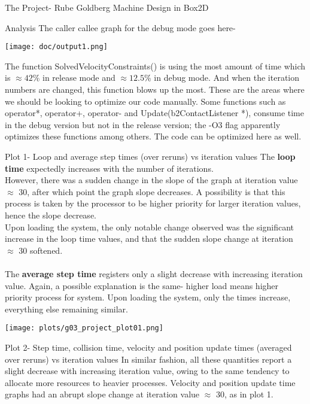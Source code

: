 \documentclass[a4paper,11pt]{article}
\begin{document}
\begin{section}{The Project- Rube Goldberg Machine Design in Box2D}
\begin{subsection}{Analysis}
The caller callee graph for the debug mode goes here-
\begin{center}\texttt{[image: doc/output1.png]}\end{center}
The function SolvedVelocityConstraints() is using the most amount of time which is \(\approx 42\%\) in release mode and \(\approx 12.5\%\) in debug mode. And when the iteration numbers are changed, this function blows up the most. These are the areas where we should be looking to optimize our code manually.
Some functions such as operator*, operator+, operator- and Update(b2ContactListener *), consume time in the debug version but not in the release version; the -O3 flag apparently optimizes these functions among others. The code can be optimized here as well.\\
\end{subsection}
\begin{subsection}{Plot 1- Loop and average step times (over reruns) vs iteration values}
The \textbf{loop time} expectedly increases with the number of iterations.\\ However, there was a sudden change in the slope of the graph at iteration value \(\approx\) 30, after which point the graph slope decreases. A possibility is that this process is taken by the processor to be higher priority for larger iteration values, hence the slope decrease.\\ Upon loading the system, the only notable change observed was the significant increase in the loop time values, and that the sudden slope change at iteration \(\approx\) 30 softened.\\\\
The \textbf{average step time} registers only a slight decrease with increasing iteration value. Again, a possible explanation is the same- higher load means higher priority process for system. Upon loading the system, only the times increase, everything else remaining similar.
\begin{center}\texttt{[image: plots/g03\_project\_plot01.png]}\end{center}
\end{subsection}
\begin{subsection}{Plot 2- Step time, collision time, velocity and position update times (averaged over reruns) vs iteration values}
In similar fashion, all these quantities report a slight decrease with increasing iteration value, owing to the same tendency to allocate more resources to heavier processes. Velocity and position update time graphs had an abrupt slope change at iteration value \(\approx\) 30, as in plot 1.

\end{subsection}
\end{section}
\end{document}
